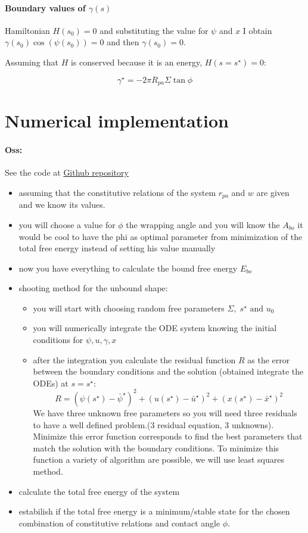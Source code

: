 \documentclass[12pt]{article}
\begin{document}
\paragraph*{Boundary values of $\gamma(s)$}
Hamiltonian $H(s_0)=0$ and substituting the value for $\psi$ and $x$ I obtain $\gamma(s_0) \cos(\psi(s_0))=0$ and then $\gamma(s_0)=0$. 

Assuming that $H$ is conserved because it is an energy, $H(s=s^\star)=0$: 

$$
\gamma^\star = - 2 \pi R_{pa} \Sigma \tan \phi
$$

\section{Numerical implementation}
\paragraph{Oss:} See the code at \href{https://github.com/pietro-sillano/shapes/tree/main}{Github repository}


\begin{itemize}
  \item assuming that the constitutive relations of the system $r_{pa}$ and $w$ are given and we know its values.
  \item you will choose a value for $\phi$ the wrapping angle and you will know the $A_{bo}$ \alert{it would be cool to have the phi as optimal parameter from minimization of the total free energy instead of setting his value manually}
  \item now you have everything to calculate the bound free energy $E_{bo}$
  \item shooting method for the unbound shape: 
    \begin{itemize}
      \item you will start with choosing random free parameters $\Sigma,\; s^\star \text{ and }u_0$
      \item you will numerically integrate the ODE system knowing the initial conditions for $\psi,u,\gamma,x$
      \item after the integration you calculate the residual function $R$ as the error between the boundary conditions and the solution (obtained integrate the ODEs) at $s=s^\star$:
      $$
      R = (\psi(s^\star) - \bar{\psi}^\star)^2  + (u(s^\star) - \bar{u}^\star)^2 +  (x(s^\star) -\bar{x}^\star)^2 
      $$
      We have three unknown free parameters so you will need three residuals to have a well defined problem.(3 residual equation, 3 unknowns). Minimize this error function corresponds to find the best parameters that match the solution with the boundary conditions. To minimize this function a variety of algorithm are possible, we will use least squares method. 
    \end{itemize}
  \item calculate the total free energy of the system
  \item estabilish if the total free energy is a minimum/stable state for the chosen combination of constitutive relations and contact angle $\phi$.
\end{itemize}
\end{document}
